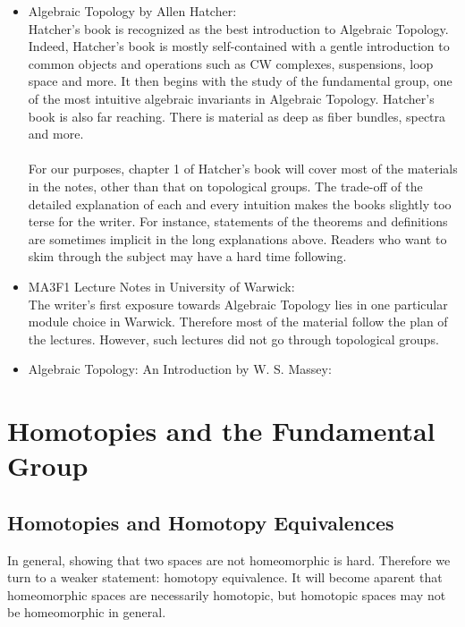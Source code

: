 \documentclass[a4paper]{article}
\begin{document}
\begin{itemize}
\item Algebraic Topology by Allen Hatcher: \\
Hatcher's book is recognized as the best introduction to Algebraic Topology. Indeed, Hatcher's book is mostly self-contained with a gentle introduction to common objects and operations such as CW complexes, suspensions, loop space and more. It then begins with the study of the fundamental group, one of the most intuitive algebraic invariants in Algebraic Topology. Hatcher's book is also far reaching. There is material as deep as fiber bundles, spectra and more. \\~\\

For our purposes, chapter 1 of Hatcher's book will cover most of the materials in the notes, other than that on topological groups. The trade-off of the detailed explanation of each and every intuition makes the books slightly too terse for the writer. For instance, statements of the theorems and definitions are sometimes implicit in the long explanations above. Readers who want to skim through the subject may have a hard time following. 

\item MA3F1 Lecture Notes in University of Warwick: \\
The writer's first exposure towards Algebraic Topology lies in one particular module choice in Warwick. Therefore most of the material follow the plan of the lectures. However, such lectures did not go through topological groups. 

\item Algebraic Topology: An Introduction by W. S. Massey: \\
\end{itemize}

\pagebreak
\tableofcontents
\pagebreak

\section{Homotopies and the Fundamental Group}
\subsection{Homotopies and Homotopy Equivalences}
In general, showing that two spaces are not homeomorphic is hard. Therefore we turn to a weaker statement: homotopy equivalence. It will become aparent that homeomorphic spaces are necessarily homotopic, but homotopic spaces may not be homeomorphic in general. \\~\\
\end{document}
